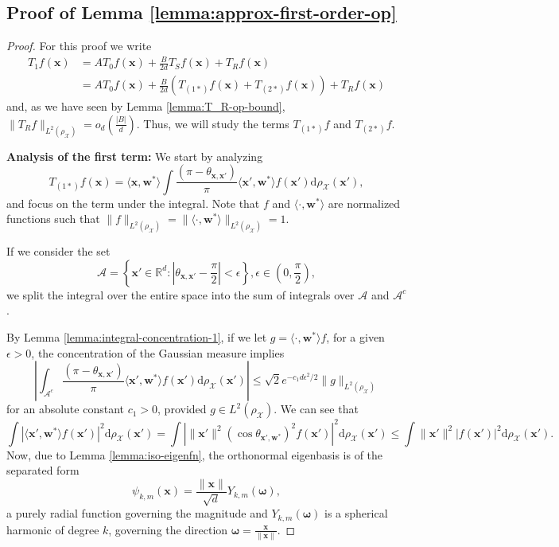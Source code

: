 \subsection{Proof of Lemma \ref{lemma:approx-first-order-op}}\label{app:lemma-first-order-op}
\begin{proof}
    For this proof we write
    \begin{align*}
        T_1 f(\bm x) &= AT_0 f(\bm x) + \frac{B}{2d} T_{S} f(\bm x)+  T_R f(\bm x)\\
        &= AT_0 f(\bm x) + \frac{B}{2d} \left(T_{(1*)} f(\bm x) + T_{(2*)} f(\bm x)\right) +  T_R f(\bm x)
    \end{align*}
    and, as we have seen by Lemma \ref{lemma:T_R-op-bound}, $\|T_Rf\|_{L^2(\rho_\mathcal X)} = o_d\left(\frac{|B|}{d}\right)$. Thus, we will study the terms $T_{(1*)}f$ and $T_{(2*)} f$.
    
    {\bf Analysis of the first term:}
    We start by analyzing
    \[
        T_{(1*)}f(\bm x) =\langle \bm x, \bm w^*\rangle\int \frac{(\pi - \theta_{\bm x, \bm x'})}{\pi}\langle \bm x', \bm w^*\rangle f(\bm x')\mathrm d\rho_{\mathcal X}(\bm x'),
    \]    
    and focus on the term under the integral. Note that $f$ and $\langle \cdot, \bm w^*\rangle$ are normalized functions such that $\|f\|_{L^2(\rho_{\mathcal X})} = \|\langle \cdot, \bm w^*\rangle\|_{L^2(\rho_{\mathcal X})} = 1.$
    
    If we consider the set 
    \[
        \mathcal A = \left\{\bm x' \in \mathbb R^d: \left|\theta_{\bm x, \bm x'} - \frac{\pi}{2}\right|< \epsilon \right\}, \epsilon \in \left(0, \frac{\pi}{2}\right),
    \]
    we split the integral over the entire space into the sum of integrals over $\mathcal A$ and $\mathcal A^c$.
    
    
    By Lemma \ref{lemma:integral-concentration-1}, if we let $g = \langle \cdot, \bm w^*\rangle f$, for a given $\epsilon > 0$, the concentration of the Gaussian measure implies
    \[
        \left|\int_{\mathcal A^c} \frac{(\pi - \theta_{\bm x, \bm x'})}{\pi} \langle \bm x', \bm w^*\rangle f(\bm x') \mathrm d\rho_{\mathcal X}(\bm x')\right| \leq \sqrt 2e^{-c_1d\epsilon^2/2}\|g\|_{L^2(\rho_{\mathcal X})}
    \]
    for an absolute constant $c_1 > 0$, provided $g \in L^2(\rho_{\mathcal X})$.
    We can see that
    \[
        \int |\langle \bm x', \bm w^*\rangle f(\bm x')|^2\mathrm d \rho_{\mathcal X}(\bm x')  = \int |\|\bm x'\|^2 (\cos\theta_{\bm x', \bm w^*})^2 f(\bm x')|^2\mathrm d \rho_{\mathcal X}(\bm x') \leq \int \|\bm x'\|^2 |f(\bm x')|^2\mathrm d \rho_{\mathcal X}(\bm x').
    \]
    Now, due to Lemma \ref{lemma:iso-eigenfn}, the orthonormal eigenbasis is of the separated form
    \[
        \psi_{k,m}(\bm{x}) = \frac{\|\bm x\|}{\sqrt d}Y_{k,m}(\bm \omega),
    \]
    a purely radial function governing the magnitude and $Y_{k,m}(\bm \omega)$ is a spherical harmonic of degree $k$, governing the direction $\bm \omega = \frac{\bm x}{\|\bm x\|}$.


\end{proof}
